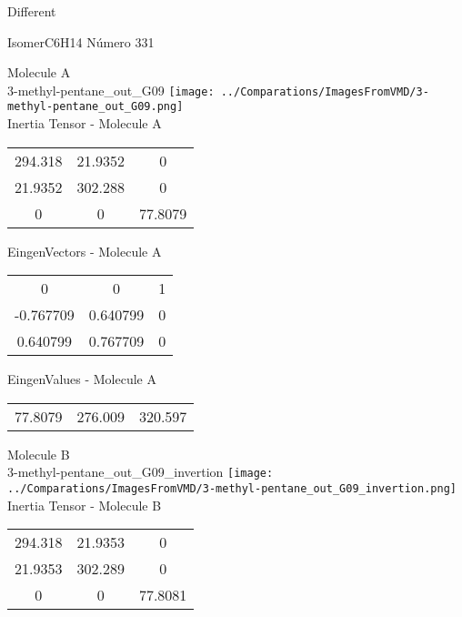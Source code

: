 \begin{center}
\vtab
\vtab
\textcolor{NavyBlue}{\Large Different}
\end{center}

 \newpage

\vtab[-2cm]
\begin{center}
{\large IsomerC6H14 \tab Número 331}
\end{center}
\begin{multicols}{2}
\begin{center}

Molecule A \\ 
3-methyl-pentane\_out\_G09
\texttt{[image: ../Comparations/ImagesFromVMD/3-methyl-pentane\_out\_G09.png]}
\\
Inertia Tensor - Molecule A \\
\vtab

\begin{tabular}{|c c c|}
294.318	 & 	21.9352	 & 	0	 \\
21.9352	 & 	302.288	 & 	0	 \\
0	 & 	0	 & 	77.8079
\end{tabular}

\vtab
 EingenVectors - Molecule A     \\
\vtab
\begin{tabular}{|c c c|}
0	 & 	0	 & 	1	 \\
-0.767709	 & 	0.640799	 & 	0	 \\
0.640799	 & 	0.767709	 & 	0
\end{tabular}

\vtab
 EingenValues - Molecule A     \\
\vtab
\begin{tabular}{|c c c|}
77.8079	 & 	276.009	 & 	320.597	 \\
\end{tabular}
\columnbreak

Molecule B \\ 
3-methyl-pentane\_out\_G09\_invertion
\texttt{[image: ../Comparations/ImagesFromVMD/3-methyl-pentane\_out\_G09\_invertion.png]}
\\
Inertia Tensor - Molecule B \\
\vtab

\begin{tabular}{|c c c|}
294.318	 & 	21.9353	 & 	0	 \\
21.9353	 & 	302.289	 & 	0	 \\
0	 & 	0	 & 	77.8081
\end{tabular}


\end{center}
\end{multicols}
